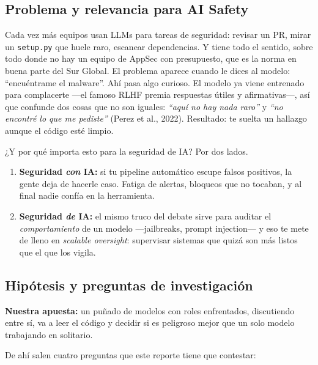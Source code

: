 \documentclass[10pt]{article}
\begin{document}
\subsection{Problema y relevancia para AI Safety}

Cada vez más equipos usan LLMs para tareas de seguridad: revisar un PR, mirar un
\texttt{setup.py} que huele raro, escanear dependencias. Y tiene todo el sentido, sobre
todo donde no hay un equipo de AppSec con presupuesto, que es la norma en buena parte
del Sur Global. El problema aparece cuando le dices al modelo: ``encuéntrame el
malware''. Ahí pasa algo curioso. El modelo ya viene entrenado para complacerte ---el
famoso RLHF premia respuestas útiles y afirmativas---, así que confunde dos cosas que no
son iguales: \textit{``aquí no hay nada raro''} y \textit{``no encontré lo que me
pediste''} (Perez et al., 2022). Resultado: te suelta un hallazgo aunque el código esté
limpio.

¿Y por qué importa esto para la seguridad de IA? Por dos lados.

\begin{enumerate}[leftmargin=*]
  \item \textbf{Seguridad \textit{con} IA:} si tu pipeline automático escupe falsos
  positivos, la gente deja de hacerle caso. Fatiga de alertas, bloqueos que no tocaban,
  y al final nadie confía en la herramienta.
  \item \textbf{Seguridad \textit{de} IA:} el mismo truco del debate sirve para auditar
  el \textit{comportamiento} de un modelo ---jailbreaks, prompt injection--- y eso te
  mete de lleno en \textit{scalable oversight}: supervisar sistemas que quizá son más
  listos que el que los vigila.
\end{enumerate}

\subsection{Hipótesis y preguntas de investigación}

\textbf{Nuestra apuesta:} un puñado de modelos con roles enfrentados, discutiendo entre
sí, va a leer el código y decidir si es peligroso mejor que un solo modelo trabajando en
solitario.

De ahí salen cuatro preguntas que este reporte tiene que contestar:
\end{document}
